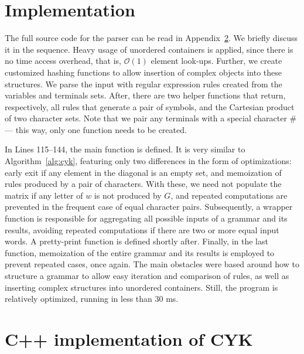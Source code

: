 \documentclass[12pt]{article}
\begin{document}
\section{Implementation}\label{sec:imp}

The full source code for the parser can be read in Appendix~\ref{app:impl}. We briefly discuss it in the sequence. Heavy usage of unordered containers is applied, since there is no time access overhead, that is, $\mathcal{O}(1)$ element look-ups. Further, we create customized hashing functions to allow insertion of complex objects into these structures. We parse the input with regular expression rules created from the variables and terminals sets. After, there are two helper functions that return, respectively, all rules that generate a pair of symbols, and the Cartesian product of two character sets. Note that we pair any terminals with a special character $\#$ --- this way, only one function needs to be created. 

In Lines 115--144, the main function is defined. It is very similar to Algorithm~\ref{alg:cyk}, featuring only two differences in the form of optimizations: early exit if any element in the diagonal is an empty set, and memoization of rules produced by a pair of characters. With these, we need not populate the matrix if any letter of $w$ is not produced by $G$, and repeated computations are prevented in the frequent case of equal character pairs. Subsequently, a wrapper function is responsible for aggregating all possible inputs of a grammar and its results, avoiding repeated computations if there are two or more equal input words. A pretty-print function is defined shortly after. Finally, in the last function, memoization of the entire grammar and its results is employed to prevent repeated cases, once again. The main obstacles were based around how to structure a grammar to allow easy iteration and comparison of rules, as well as inserting complex structures into unordered containers. Still, the program is relatively optimized, running in less than 30 ms.




\appendix

\section{C++ implementation of CYK}\label{app:impl}

\end{document}
